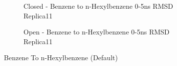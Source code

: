 \documentclass[T4paper.tex]{subfiles}
\begin{document}
\begin{figure}
\begin{subfigure}{\textwidth}
   \centering
   \caption{Closed - Benzene to n-Hexylbenzene 0-5ns RMSD Replica11}
   \label{fig:c_opls3_1/RMSD-replica11}
\end{subfigure}
\centering
\begin{subfigure}{\textwidth}
  \centering
   \caption{Open - Benzene to n-Hexylbenzene 0-5ns RMSD Replica11}
   \label{fig:o_opls3_1/RMSD-replica11}
\end{subfigure}%
\caption{Benzene To n-Hexylbenzene (Default)}
\label{fig:benzene_to_n-hexyl}
\end{figure}
\end{document}
